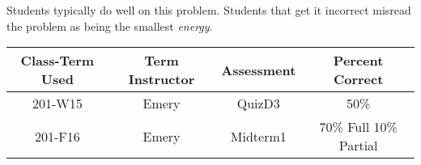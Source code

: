 \begin{outcomes}

Students typically do well on this problem. Students that get it incorrect misread the problem as being the smallest \emph{energy}.

	\begin{center}
		\begin{tabular}{cccc}
			\hline\hline
			Class-Term Used & Term Instructor & Assessment & Percent Correct\\
			\hline
			201-W15 & Emery & QuizD3 & 50\%\\
			201-F16 & Emery & Midterm1 & 70\% Full 10\% Partial\\
			\hline
		\end{tabular}
	\end{center}

\end{outcomes}